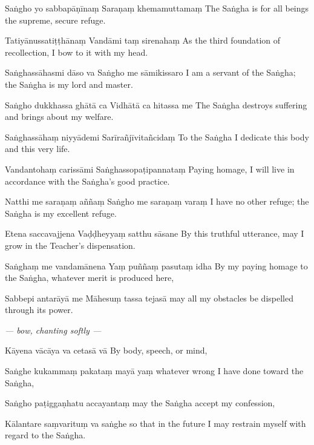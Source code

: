 \begin{chantsubsection}
  \chantlinepair
    {Saṅgho yo sabbapāṇīnaṃ}
    {Saraṇaṃ khemamuttamaṃ}
    {The Saṅgha is for all beings the supreme, secure refuge.}

  \chantlinepair
    {Tatiyānussatiṭṭhānaṃ}
    {Vandāmi taṃ sirenahaṃ}
    {As the third foundation of recollection, I bow to it with my head.}

  \chantlinepair
    {Saṅghassāhasmi dāso\footnotemark{} va}
    {Saṅgho me sāmikissaro}
    {I am a servant of the Saṅgha; the Saṅgha is my lord and master.}

  \chantlinepair
    {Saṅgho dukkhassa ghātā ca}
    {Vidhātā ca hitassa me}
    {The Saṅgha destroys suffering and brings about my welfare.}

  \chantlinepair
    {Saṅghassāhaṃ niyyādemi}
    {Sarīrañjīvitañcidaṃ}
    {To the Saṅgha I dedicate this body and this very life.}

  \chantlinepair
    {Vandantohaṃ\footnotemark{} carissāmi}
    {Saṅghassopaṭipannataṃ}
    {Paying homage, I will live in accordance with the Saṅgha’s good practice.}

  \chantlinepair
    {Natthi me saraṇaṃ aññaṃ}
    {Saṅgho me saraṇaṃ varaṃ}
    {I have no other refuge; the Saṅgha is my excellent refuge.}

  \chantlinepair
    {Etena saccavajjena}
    {Vaḍḍheyyaṃ satthu sāsane}
    {By this truthful utterance, may I grow in the Teacher’s dispensation.}

  \chantlinepair
    {Saṅghaṃ me vandamānena\footnotemark{}}
    {Yaṃ puññaṃ pasutaṃ idha}
    {By my paying homage to the Saṅgha, whatever merit is produced here,}

  \chantlinepair
    {Sabbepi antarāyā me}
    {Māhesuṃ tassa tejasā}
    {may all my obstacles be dispelled through its power.}
\end{chantsubsection}

\chantgap
\begin{chantsubsection}
  \chantnote
    {\textit{--- bow, chanting softly ---}}

\chantgap

  \chantline
    {Kāyena vācāya va cetasā vā}
    {By body, speech, or mind,}

  \chantline
    {Saṅghe kukammaṃ pakataṃ mayā yaṃ}
    {whatever wrong I have done toward the Saṅgha,}

  \chantline
    {Saṅgho paṭiggaṇhatu accayantaṃ}
    {may the Saṅgha accept my confession,}

  \chantline
    {Kālantare saṃvarituṃ va saṅghe}
    {so that in the future I may restrain myself with regard to the Saṅgha.}
\end{chantsubsection}
